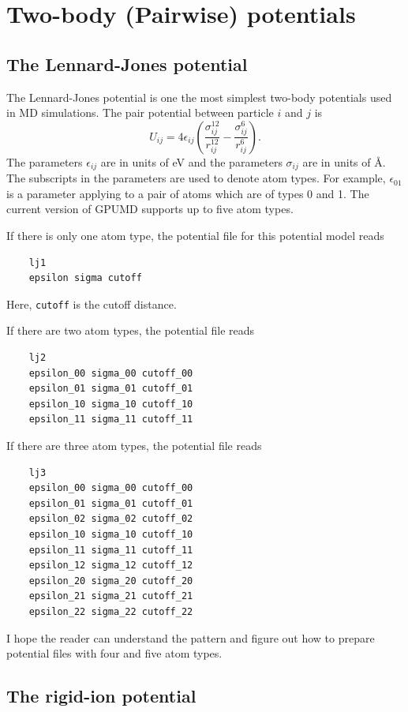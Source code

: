 \documentclass[12pt,a4paper]{report}
\begin{document}
\section{Two-body (Pairwise) potentials}

\subsection{The Lennard-Jones potential}

The Lennard-Jones potential is one the most simplest two-body potentials used in MD simulations. The pair potential between particle $i$ and $j$ is
\begin{equation}
U_{ij} = 4 \epsilon_{ij}
\left(
\frac{ \sigma_{ij}^{12} }{ r_{ij}^{12} } -
\frac{\sigma_{ij}^{6} }{ r_{ij}^{6} }
\right).
\end{equation}
The parameters $\epsilon_{ij}$ are in units of eV and the parameters $\sigma_{ij}$ are in units of \AA. The subscripts in the parameters are used to denote atom types. For example, $\epsilon_{01}$ is a parameter applying to a pair of atoms which are of types 0 and 1. The current version of GPUMD supports up to five atom types. 

If there is only one atom type, the potential file for this potential model reads
\begin{verbatim}
    lj1
    epsilon sigma cutoff
\end{verbatim}
Here, \verb"cutoff" is the cutoff distance.

If there are two atom types, the potential file reads
\begin{verbatim}
    lj2
    epsilon_00 sigma_00 cutoff_00
    epsilon_01 sigma_01 cutoff_01
    epsilon_10 sigma_10 cutoff_10
    epsilon_11 sigma_11 cutoff_11
\end{verbatim}

If there are three atom types, the potential file reads
\begin{verbatim}
    lj3
    epsilon_00 sigma_00 cutoff_00
    epsilon_01 sigma_01 cutoff_01
    epsilon_02 sigma_02 cutoff_02
    epsilon_10 sigma_10 cutoff_10
    epsilon_11 sigma_11 cutoff_11
    epsilon_12 sigma_12 cutoff_12
    epsilon_20 sigma_20 cutoff_20
    epsilon_21 sigma_21 cutoff_21
    epsilon_22 sigma_22 cutoff_22
\end{verbatim}

I hope the reader can understand the pattern and figure out how to prepare potential files with four and five atom types. 


\subsection{The rigid-ion potential}
\end{document}
